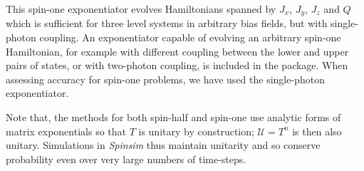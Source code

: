 \documentclass{jors}
\begin{document}
		This spin-one exponentiator evolves Hamiltonians spanned by $ J_x $, $ J_y $, $ J_z $ and $ Q $ which is sufficient for three level systems in arbitrary bias fields, but with single-photon coupling.
		An exponentiator capable of evolving an arbitrary spin-one Hamiltonian, for example with different coupling between the lower and upper pairs of states, or with two-photon coupling, is included in the package.
		When assessing accuracy for spin-one problems, we have used the single-photon exponentiator.

		Note that, the methods for both spin-half and spin-one use analytic forms of matrix exponentials so that $ T $ is unitary by construction; $ \mathcal{U}=T^n $ is then also unitary.
		Simulations in \emph{Spinsim} thus maintain unitarity and so conserve probability even over very large numbers of time-steps.
\end{document}
